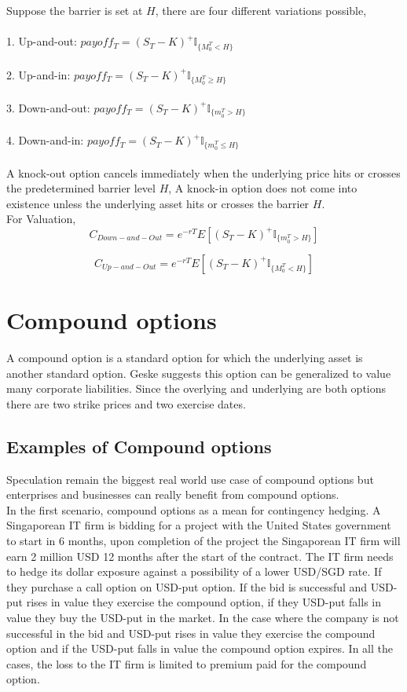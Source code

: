 \documentclass{article}
\begin{document}
Suppose the barrier is set at $H$, there are four different variations possible, \\
\\1. Up-and-out: $payoff_T = (S_T-K)^{+}\mathbb{I}_{\{M_0^T<H\}}$  \\
\\2. Up-and-in:  $payoff_T = (S_T-K)^{+}\mathbb{I}_{\{M_0^T \geq H\}}$\\
\\3. Down-and-out: $payoff_T = (S_T-K)^{+}\mathbb{I}_{\{m_0^T>H\}}$ \\
\\4. Down-and-in:  $payoff_T = (S_T-K)^{+}\mathbb{I}_{\{m_0^T \leq H\}}$\\
\\A knock-out option cancels immediately when the underlying price hits or crosses the predetermined barrier level $H$, A knock-in option does not come into existence  unless the underlying asset hits or crosses the barrier $H$.\\

For Valuation, \\

\[
C_{Down-and-Out} = e^{-rT} E[(S_T-K)^{+}\mathbb{I}_{\{m_0^T>H\}}]
\]

\[
C_{Up-and-Out} = e^{-rT} E[(S_T-K)^{+}\mathbb{I}_{\{M_0^T<H\}}]
\]

\section{Compound options
}
A compound option is a standard option for which the underlying asset is another standard option. Geske \cite{Geske1} suggests this option can be generalized to value many corporate liabilities.  Since the overlying and underlying are both options there are two strike prices and two exercise dates. 

\subsection{Examples of Compound options
}
Speculation remain the biggest real world use case of compound options but enterprises and businesses can really benefit from compound options.\\

In the first scenario, compound options as a mean for contingency hedging. A Singaporean IT firm is bidding for a project with the United States government to start in 6 months, upon completion of the project the Singaporean IT firm will earn 2 million USD 12 months after the start of the contract.  The IT firm needs to hedge its dollar exposure against a possibility of a lower USD/SGD rate.  If they purchase a call option on USD-put option.  If the bid is successful and USD-put rises in value they exercise the compound option, if they USD-put falls in value they buy the USD-put in the market.  In the case where the company is not successful in the bid and USD-put rises in value they exercise the compound option and if the USD-put falls in value the compound option expires.  In all the cases, the loss to the IT firm is limited to premium paid for the compound option.\\
\end{document}
